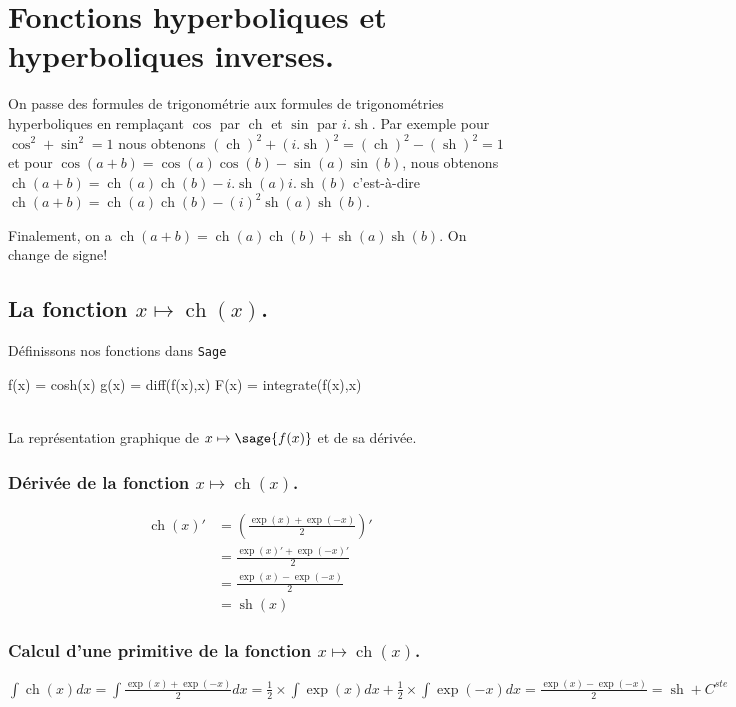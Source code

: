 \documentclass[a4paper,landscape,17pt]{extreport} %
\renewcommand{\sinh}{\mathop{\mathrm{sh}}}
\renewcommand{\cosh}{\mathop{\mathrm{ch}}}
\begin{document}
\chapter{Fonctions hyperboliques et hyperboliques inverses.}


On passe des formules de trigonométrie aux formules de trigonométries hyperboliques en remplaçant $\cos$ par $\cosh$ et $\sin$ par $i . \sinh$. Par exemple pour $\cos^2+\sin^2=1$
nous obtenons $(\cosh)^2 + (i . \sinh)^2= (\cosh)^2 - (\sinh)^2 = 1$ et pour $\cos(a+b)=\cos(a) \cos(b) - \sin(a) \sin(b) $, nous obtenons $\cosh(a+b)=\cosh(a) \cosh(b) - i .\sinh(a) i . \sinh(b) $ c'est-à-dire $\cosh(a+b)=\cosh(a) \cosh(b) - (i)^2 \sinh(a) \sinh(b) $.  

Finalement, on a $\cosh(a+b) = \cosh(a) \cosh(b) + \sinh(a) \sinh(b) $. On change de signe!


\section{La fonction  $x \mapsto \cosh(x)$.}

Définissons nos fonctions dans {\texttt{Sage}}
\begin{sageblock}
    f(x) = cosh(x)
    g(x) = diff(f(x),x)
    F(x) = integrate(f(x),x)
\end{sageblock}



\begin{center}
 \\
La représentation graphique de $x \mapsto \sage{f(x)} $ et de sa dérivée. 
\end{center}

\subsection{Dérivée de la fonction $x \mapsto \cosh(x)$.}
\begin{align*}
\cosh(x)' & = \left( \frac{\exp(x)+\exp(-x)}{2} \right)' \\ 
& = \frac{\exp(x)'+\exp(-x)'}{2} \\
& = \frac{\exp(x)-\exp(-x)}{2} \\
& = \sinh(x)
\end{align*}

\subsection{Calcul d'une primitive de la fonction  $x \mapsto \cosh(x)$.}
$\int \cosh(x) dx = \int \frac{\exp(x)+ \exp(-x)}{2} dx = \frac{1}{2} \times \int \exp(x) dx + \frac{1}{2} \times \int \exp(-x) dx = \frac{ \exp(x) - \exp(-x) }{2} = \sinh + C^{ste}$
\end{document}
